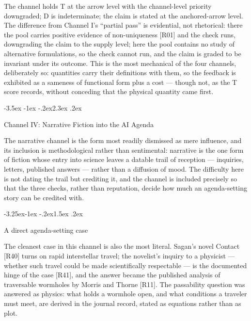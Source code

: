 \documentclass[11pt,a4paper]{article}
\makeatletter
\renewcommand\section{\@startsection{section}{1}{\z@}%
  {-3.5ex \@plus -1ex \@minus -.2ex}{2.3ex \@plus .2ex}%
  {\normalfont\Large\bfseries\raggedright}}
\renewcommand\subsection{\@startsection{subsection}{2}{\z@}%
  {-3.25ex\@plus -1ex \@minus -.2ex}{1.5ex \@plus .2ex}%
  {\normalfont\large\bfseries\raggedright}}
\makeatother
\begin{document}
The channel holds T at the arrow level with the channel-level priority downgraded; D is indeterminate; the claim is stated at the anchored-arrow level. The difference from Channel I's ``partial pass'' is evidential, not rhetorical: there the pool carries positive evidence of non-uniqueness [R01] and the check runs, downgrading the claim to the supply level; here the pool contains no study of alternative formulations, so the check cannot run, and the claim is graded to be invariant under its outcome. This is the most mechanical of the four channels, deliberately so: quantities carry their definitions with them, so the feedback is exhibited as a sameness of functional form plus a cost — though not, as the T score records, without conceding that the physical quantity came first.

\section{Channel IV: Narrative Fiction into the AI Agenda}

The narrative channel is the form most readily dismissed as mere influence, and its inclusion is methodological rather than sentimental: narrative is the one form of fiction whose entry into science leaves a datable trail of reception --- inquiries, letters, published answers --- rather than a diffusion of mood. The difficulty here is not dating the trail but crediting it, and the channel is included precisely so that the three checks, rather than reputation, decide how much an agenda-setting story can be credited with.

\subsection{A direct agenda-setting case}

The cleanest case in this channel is also the most literal. Sagan's novel Contact [R40] turns on rapid interstellar travel; the novelist's inquiry to a physicist — whether such travel could be made scientifically respectable — is the documented hinge of the case [R41], and the answer became the published analysis of traversable wormholes by Morris and Thorne [R11]. The passability question was answered as physics: what holds a wormhole open, and what conditions a traveler must meet, are derived in the journal record, stated as equations rather than as plot.
\end{document}

